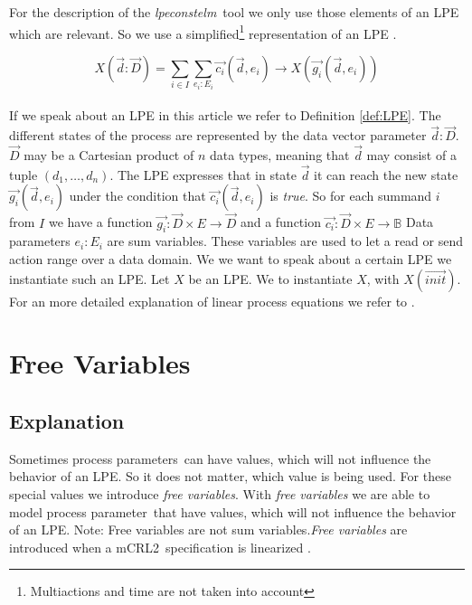\index{}\documentclass[a4paper,10pt]{article}
\theoremstyle{plain}
\theoremstyle{definition}
\newcommand{\lpe}{linear process equation}
\newcommand{\tool}{\textit{lpeconstelm}}
\newcommand{\ovr}{\overrightarrow}
\newcommand{\mcrl}{mCRL2}
\newcommand{\pp}{process parameter}
\newcommand{\pps}{process parameters}
\newcommand{\ti}{\textit}
\begin{document}
For the description of the \tool\ tool we only use those elements of an LPE which are relevant. So we use a simplified\footnote{Multiactions and time are not taken into account} representation of an LPE .
\begin{defn}\label{def:LPE}
\begin{displaymath}
X (\ovr{d}:\ovr{D}) = \sum_{i \in I} \sum_{e_i:E_i} \ovr{c_i} ( \ovr{d}, e_i ) \rightarrow X(\ovr{g_i}(\ovr{d},e_i))
\end{displaymath}\\
If we speak about an LPE in this article we refer to Definition \ref{def:LPE}.  The different states 
of the process are represented by the data vector parameter $\ovr{d}:\ovr{D}$. $\ovr{D}$ may be a Cartesian product of $n$ data types, meaning that $\ovr{d}$ may consist of a tuple $(d_1, \ldots, d_n)$. The LPE expresses that in state $\ovr{d}$ %
it can reach the new state $\ovr{g_i}(\ovr{d},e_i)$ under the condition that $\ovr{c_i}(\ovr{d},e_i)$ is \ti{true}. So for each summand $i$ from $I$ we have a function $\ovr{g_i}: \ovr{D} \times E \rightarrow \ovr{D}$ and a function $\ovr{c_i}: \ovr{D} \times E \rightarrow \mathbb{B}$
Data parameters $e_i : E_i$ are sum variables. These variables are used to let a read or send action range over a data domain. 
We we want to speak about a certain LPE we instantiate such an LPE. Let $X$ be an LPE. 
We to instantiate $X$, with $X(\ovr{init})$. \\

For an more detailed explanation of \lpe s  we refer to \cite{LPE_info}.
\end{defn}

\section{Free Variables}
\subsection{Explanation}

Sometimes \pps\ can have values, which will not influence the behavior of an LPE. So it does not matter, which value is  being used. For these special values we introduce \ti{free variables}. With \ti{free variables} we are able to model \pp\ that have values, which will not influence the behavior of an LPE. Note: Free variables are not sum variables.\ti{Free variables} are introduced when a \mcrl\ specification is linearized \cite{lin}.
\end{document}
